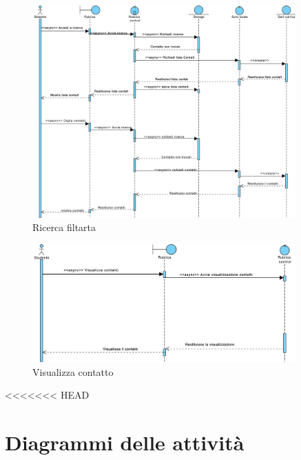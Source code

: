 \begin{figure}[H]
\centering
\includegraphics[width=0.9\textwidth]{imgs/gruppo5/sequence2.pdf}
\caption{Ricerca filtarta}
\label{fig:seq2-rubrica}
\end{figure}

\begin{figure}[H]
	\centering
	\includegraphics[width=0.9\textwidth]{imgs/gruppo5/sequence3.pdf}
	\caption{Visualizza contatto}
	\label{fig:seq3-rubrica}
\end{figure}

<<<<<<< HEAD

\clearpage

\section{Diagrammi delle attività}

